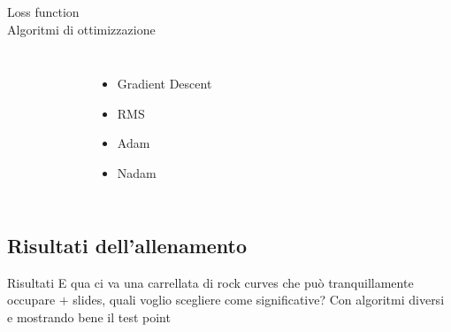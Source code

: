\documentclass{beamer}
\begin{document}
\begin{frame}{Loss function \\Algoritmi di ottimizzazione}
  \begin{columns}
      \begin{figure}
        \centering
      \end{figure}
      \begin{itemize}
        \item Gradient Descent
        \item RMS
        \item Adam
        \item Nadam
      \end{itemize}
  \end{columns}

%
%
%
\end{frame}

\subsection{Risultati dell'allenamento}
\begin{frame}{Risultati}
  E qua ci va una carrellata di rock curves che può tranquillamente occupare $+$ slides, quali voglio scegliere come significative? Con algoritmi diversi e mostrando bene il test point

\end{frame}
\end{document}
